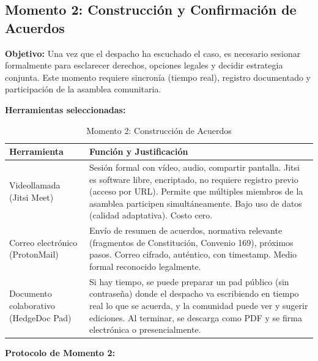 ﻿\documentclass[
  spanish,
  letterpaper, oneside
]{article}
\begin{document}
\subsection{Momento 2: Construcción y Confirmación de Acuerdos}

\textbf{Objetivo:} Una vez que el despacho ha escuchado el caso, es necesario sesionar 
formalmente para esclarecer derechos, opciones legales y decidir estrategia conjunta. 
Este momento requiere sincronía (tiempo real), registro documentado y participación de 
la asamblea comunitaria.

\textbf{Herramientas seleccionadas:}

\begin{table}[h]
\centering
\small
\begin{tabular}{@{}lp{8cm}@{}}
\toprule
\textbf{Herramienta} & \textbf{Función y Justificación} \\
\midrule
Videollamada (Jitsi Meet) & Sesión formal con vídeo, audio, compartir pantalla. Jitsi es software 
libre, encriptado, no requiere registro previo (acceso por URL). Permite que múltiples miembros 
de la asamblea participen simultáneamente. Bajo uso de datos (calidad adaptativa). Costo cero. \\
\midrule
Correo electrónico (ProtonMail) & Envío de resumen de acuerdos, normativa relevante (fragmentos 
de Constitución, Convenio 169), próximos pasos. Correo cifrado, auténtico, con timestamp. 
Medio formal reconocido legalmente. \\
\midrule
Documento colaborativo (HedgeDoc Pad) & Si hay tiempo, se puede preparar un pad público (sin 
contraseña) donde el despacho va escribiendo en tiempo real lo que se acuerda, y la comunidad 
puede ver y sugerir ediciones. Al terminar, se descarga como PDF y se firma electrónica o 
presencialmente. \\
\bottomrule
\end{tabular}
\caption{Momento 2: Construcción de Acuerdos}
\label{tab:momento2}
\end{table}

\textbf{Protocolo de Momento 2:}
\end{document}
